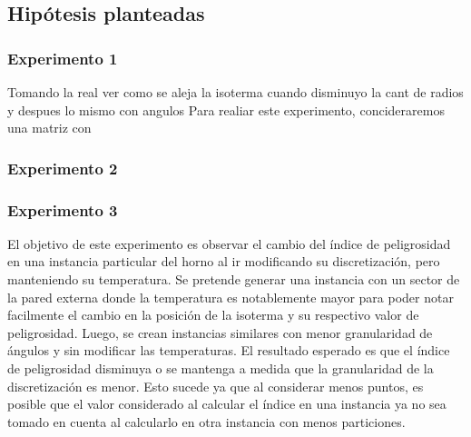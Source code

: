   \subsection{Hipótesis planteadas}

  	\subsubsection*{Experimento 1}
  	Tomando la real ver como se aleja la isoterma cuando disminuyo la cant de radios y despues lo mismo con angulos
  	Para realiar este experimento, concideraremos una matriz con 






  	\subsubsection*{Experimento 2}

  	\subsubsection*{Experimento 3}
  		El objetivo de este experimento es observar el cambio del índice de peligrosidad en una instancia particular del horno al ir modificando su discretización, pero manteniendo su temperatura. 
  		Se pretende generar una instancia con un sector de la pared externa donde la temperatura es notablemente mayor para poder notar facilmente el cambio en la posición de la isoterma y su respectivo valor de peligrosidad. Luego, se crean instancias similares con menor granularidad de ángulos y sin modificar las temperaturas. El resultado esperado es que el índice de peligrosidad disminuya o se mantenga a medida que la granularidad de la discretización es menor. Esto sucede ya que al considerar menos puntos, es posible que el valor considerado al calcular el índice en una instancia ya no sea tomado en cuenta al calcularlo en otra instancia con menos particiones.

